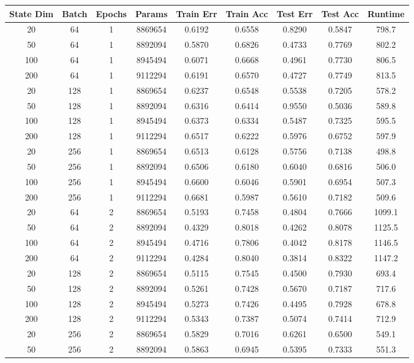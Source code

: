 \documentclass[letterpaper, 10pt]{article}
\begin{document}
\begin{longtable}{c | c | c | c | c | c | c | c | c}
State Dim & Batch & Epochs & Params & Train Err & Train Acc & Test Err & Test Acc & Runtime\\
\hline
\endhead
20 & 64 & 1 & 8869654 & 0.6192 & 0.6558 & 0.8290 & 0.5847 & 798.7 \\
50 & 64 & 1 & 8892094 & 0.5870 & 0.6826 & 0.4733 & 0.7769 & 802.2 \\
100 & 64 & 1 & 8945494 & 0.6071 & 0.6668 & 0.4961 & 0.7730 & 806.5 \\
200 & 64 & 1 & 9112294 & 0.6191 & 0.6570 & 0.4727 & 0.7749 & 813.5 \\
20 & 128 & 1 & 8869654 & 0.6237 & 0.6548 & 0.5538 & 0.7205 & 578.2 \\
50 & 128 & 1 & 8892094 & 0.6316 & 0.6414 & 0.9550 & 0.5036 & 589.8 \\
100 & 128 & 1 & 8945494 & 0.6373 & 0.6334 & 0.5487 & 0.7325 & 595.5 \\
200 & 128 & 1 & 9112294 & 0.6517 & 0.6222 & 0.5976 & 0.6752 & 597.9 \\
20 & 256 & 1 & 8869654 & 0.6513 & 0.6128 & 0.5756 & 0.7138 & 498.8 \\
50 & 256 & 1 & 8892094 & 0.6506 & 0.6180 & 0.6040 & 0.6816 & 506.0 \\
100 & 256 & 1 & 8945494 & 0.6600 & 0.6046 & 0.5901 & 0.6954 & 507.3 \\
200 & 256 & 1 & 9112294 & 0.6681 & 0.5987 & 0.5610 & 0.7182 & 509.6 \\
\hline
20 & 64 & 2 & 8869654 & 0.5193 & 0.7458 & 0.4804 & 0.7666 & 1099.1 \\
50 & 64 & 2 & 8892094 & 0.4329 & 0.8018 & 0.4262 & 0.8078 & 1125.5 \\
100 & 64 & 2 & 8945494 & 0.4716 & 0.7806 & 0.4042 & 0.8178 & 1146.5 \\
200 & 64 & 2 & 9112294 & 0.4284 & 0.8040 & 0.3814 & 0.8322 & 1147.2 \\
20 & 128 & 2 & 8869654 & 0.5115 & 0.7545 & 0.4500 & 0.7930 & 693.4 \\
50 & 128 & 2 & 8892094 & 0.5261 & 0.7428 & 0.5670 & 0.7187 & 717.6 \\
100 & 128 & 2 & 8945494 & 0.5273 & 0.7426 & 0.4495 & 0.7928 & 678.8 \\
200 & 128 & 2 & 9112294 & 0.5343 & 0.7387 & 0.5074 & 0.7414 & 712.9 \\
20 & 256 & 2 & 8869654 & 0.5829 & 0.7016 & 0.6261 & 0.6500 & 549.1 \\
50 & 256 & 2 & 8892094 & 0.5863 & 0.6945 & 0.5395 & 0.7333 & 551.3 \\

\end{longtable}
\end{document}
